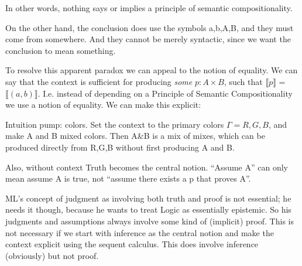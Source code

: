 In other words, nothing says or implies a principle of semantic
compositionality.

On the other hand, the conclusion does use the symbols a,b,A,B, and
they must come from somewhere. And they cannot be merely syntactic,
since we want the conclusion to mean something.

To resolve this apparent paradox we can appeal to the notion of
equality. We can say that the context is sufficient for producing
\textit{some} \(p:A\times B\), such that \(\llbracket p\rrbracket\) =
\(\llbracket(a,b)\rrbracket\). I.e. instead of depending on a
Principle of Semantic Compositionality we use a notion of equality. We
can make this explicit:


Intuition pump: colors. Set the context to the primary colors \(\Gamma
= R,G,B\), and make A and B mixed colors. Then A\&B is a mix of mixes,
which can be produced directly from R,G,B without first producing A and
B.

Also, without context Truth becomes the central notion. ``Assume A''
can only mean assume A is true, not ``assume there exists a p that
proves A''.

ML's concept of judgment as involving both truth and proof is not
essential; he needs it though, because he wants to treat Logic as
essentially epistemic. So his judgments and assumptions always involve
some kind of (implicit) proof. This is not necessary if we start with
inference as the central notion and make the context explicit using
the sequent calculus. This does involve inference (obviously) but not
proof.

